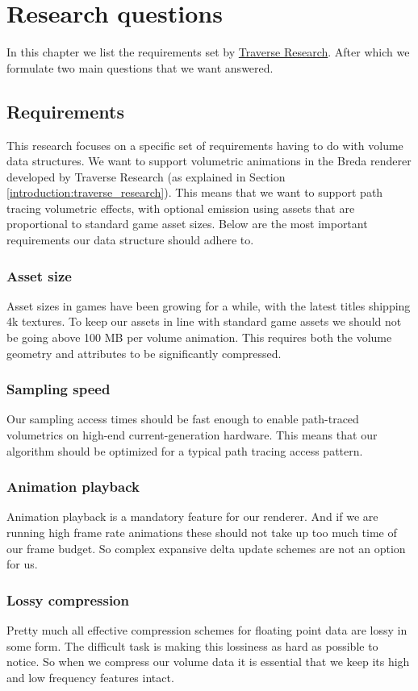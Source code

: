\section{Research questions}\label{research_questions}
In this chapter we list the requirements set by \href{https://traverseresearch.nl/}{Traverse Research}. After which we formulate two main questions that we want answered.

\subsection{Requirements} \label{requirements}
This research focuses on a specific set of requirements having to do with volume data structures. We want to support volumetric animations in the Breda renderer developed by Traverse Research (as explained in Section \ref{introduction:traverse_research}). This means that we want to support path tracing volumetric effects, with optional emission using assets that are proportional to standard game asset sizes. Below are the most important requirements our data structure should adhere to.
\subsubsection{Asset size} \label{requirements:asset_size}
Asset sizes in games have been growing for a while, with the latest titles shipping 4k textures. To keep our assets in line with standard game assets we should not be going above 100 MB per volume animation. This requires both the volume geometry and attributes to be significantly compressed.
\subsubsection{Sampling speed} \label{requirements:sampling_speed}
Our sampling access times should be fast enough to enable path-traced volumetrics on high-end current-generation hardware. This means that our algorithm should be optimized for a typical path tracing access pattern.
\subsubsection{Animation playback} \label{requirements:animation_playback}
Animation playback is a mandatory feature for our renderer. And if we are running high frame rate animations these should not take up too much time of our frame budget. So complex expansive delta update schemes are not an option for us.
\subsubsection{Lossy compression} \label{requirements:lossy_compression}
Pretty much all effective compression schemes for floating point data are lossy in some form. The difficult task is making this lossiness as hard as possible to notice. So when we compress our volume data it is essential that we keep its high and low frequency features intact.

